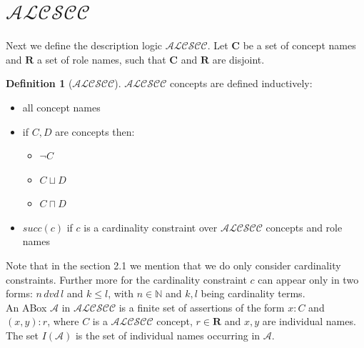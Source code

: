 \documentclass{book}
\theoremstyle{break}
\theoremstyle{definition}
\newtheorem{mydef}{Definition}
\begin{document}
\section{$\mathcal{ALCSCC}$}
Next we define the description logic $\mathcal{ALCSCC}$. Let $\mathbf{C}$ be a set of concept names and $\mathbf{R}$ a set of role names, such that $\mathbf{C}$ and $\mathbf{R}$ are disjoint.
\begin{mydef}[$\mathcal{ALCSCC}$]
$\mathcal{ALCSCC}$ concepts are defined inductively:
\begin{itemize}
\item all concept names
\item if $C,D$ are concepts then:
\begin{itemize}
\item $\neg C$
\item $C\sqcup D$
\item $C\sqcap D$
\end{itemize}
\item $succ(c)$ if $c$ is a cardinality constraint over $\mathcal{ALCSCC}$ concepts and role names
\end{itemize}
\end{mydef}
Note that in the section 2.1 we mention that we do only consider cardinality constraints. Further more for the cardinality constraint $c$ can appear only in two forms: $n\,dvd\,l$ and $k\leq l$, with $n\in\mathbb{N}$ and $k,l$ being cardinality terms.\\ 
An ABox $\mathcal{A}$ in $\mathcal{ALCSCC}$ is a finite set of assertions of the form $x:C$ and $(x,y):r$, where $C$ is a $\mathcal{ALCSCC}$ concept, $r\in\mathbf{R}$ and $x,y$ are individual names. The set $I(\mathcal{A})$ is the set of individual names occurring in $\mathcal{A}$. 
\end{document}
